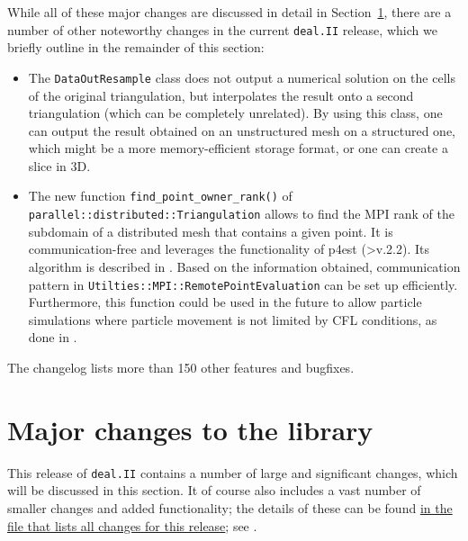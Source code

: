 \documentclass{ansarticle-preprint}
\newcommand{\specialword}[1]{\texttt{#1}}
\newcommand{\dealii}{{\specialword{deal.II}}\xspace}
\begin{document}
While all of these major changes are discussed in detail in
Section~\ref{sec:major}, there
are a number of other noteworthy changes in the current \dealii{} release,
which we briefly outline in the remainder of this section:
%
\begin{itemize}
  \item The \texttt{DataOutResample} class does not output a numerical solution 
  on the cells of the original triangulation, but interpolates the result 
  onto a second triangulation (which can be completely unrelated). 
  By using this class, one can output the result obtained on an 
  unstructured mesh on a structured one, which might be a more
  memory-efficient storage format, or one can create a slice in 3D.
  \item The new function \texttt{find\_point\_owner\_rank()} of \texttt{parallel::distributed::Triangulation} allows to find the MPI
  rank of the subdomain of a distributed mesh that contains a given point.
  It is communication-free and leverages the functionality of p4est (>v.2.2).
  Its algorithm is described in \cite{burstedde2020parallel}. Based on the information obtained,
  communication pattern in \texttt{Utilties::MPI::RemotePointEvaluation} can be set up efficiently. Furthermore, this function could be used in the future to allow
  particle simulations where particle movement is not
  limited by CFL conditions, as done in \cite{mirzadeh2016parallel}.
\end{itemize}
%
The changelog lists more than 150 other features and bugfixes.




\section{Major changes to the library}
\label{sec:major}

This release of \dealii{} contains a number of large and significant changes,
which will be discussed in this section.
It of course also includes a
vast number of smaller changes and added functionality; the details of these
can be found
\href{https://dealii.org/developer/doxygen/deal.II/changes_between_9_3_0_and_9_4_0.html}
{in the file that lists all changes for this release}; see \cite{changes94}.
\end{document}
